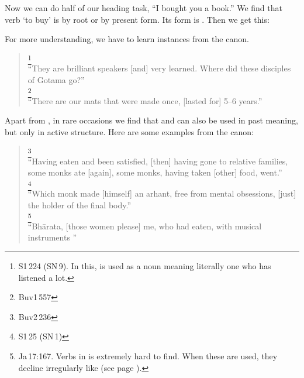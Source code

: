Now we can do half of our heading task, ``I bought you a book.'' We find that verb `to buy' is  by root or  by present form. Its  form is . Then we get this:


For more understanding, we have to learn instances from the canon.

\begin{quote}
\footnote{S1\,224 (SN\,9). In this,  is used as a noun meaning literally one who has listened a lot.}\\
``They are brilliant speakers [and] very learned. Where did these disciples of Gotama go?''\\[1.5mm]
\footnote{Buv1\,557}\\
``There are our mats that were made once, [lasted for] 5--6 years.''\\[1.5mm]
\end{quote}

Apart from , in rare occasions we find that  and  can also be used in past meaning, but only in active structure. Here are some examples from the canon:

\begin{quote}
\footnote{Buv2\,236}\\
``Having eaten and been satisfied, [then] having gone to relative families, some monks ate [again], some monks, having taken [other] food, went.''\\[1.5mm]
\footnote{S1\,25 (SN\,1)}\\
``Which monk made [himself] an arhant, free from mental obsessions, [just] the holder of the final body.''\\[1.5mm]
\footnote{Ja\,17:167. Verbs in  is extremely hard to find. When these are used, they decline irregularly like  (see page \pageref{decl:gunavm}).}\\
``Bh\=arata, [those women please] me, who had eaten, with musical instruments ''\\[1.5mm]
\end{quote}

